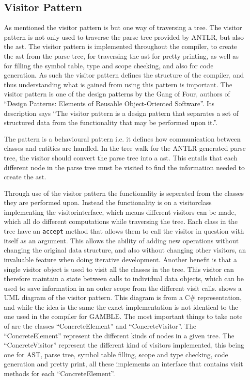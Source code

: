 \subsection*{Visitor Pattern}\label{subs:visit}
As mentioned the visitor pattern is but one way of traversing a tree.
The visitor pattern is not only used to traverse the parse tree provided by ANTLR, but also the \acrfull{ast}.
The visitor pattern is implemented throughout the compiler, to create the \acrfull{ast} from the parse tree, for traversing the \acrfull{ast} for pretty printing, as well as for filling the symbol table, type and scope checking, and also for code generation.
As such the visitor pattern defines the structure of the compiler, and thus understanding what is gained from using this pattern is important.
The visitor pattern is one of the design patterns by the Gang of Four, authors of ``Design Patterns: Elements of Reusable Object-Oriented Software''.
Its description says ``The visitor pattern is a design pattern that separates a set of structured data from the functionality that may be performed upon it.''. \citep{GOF}

The pattern is a behavioural pattern i.e. it defines how communication between classes and entities are handled.
In the tree walk for the ANTLR generated parse tree, the visitor should convert the parse tree into a \acrfull{ast}.
This entails that each different node in the parse tree must be visited to find the information needed to create the \acrfull{ast}.

Through use of the visitor pattern the functionality is seperated from the classes they are performed upon.
Instead the functionality is on a visitorclass implementing the visitorinterface, which means different visitors can be made, which all do different computations while traversing the tree.
Each class in the tree have an \texttt{accept} method that allows them to call the visitor in question with itself as an argument.
This allows the ability of adding new operations without changing the original data structure, and also without changing other visitors, an invaluable feature when doing iterative development.
Another benefit is that a single visitor object is used to visit all the classes in the tree.
This visitor can therefore maintain a state between calls to individual data objects, which can be used to save information in an outer scope from the different visit calls.
 shows a UML diagram of the visitor pattern.
This diagram is from a C\# representation, and while the idea is the same the exact implementation is not identical to the one used in the compiler for GAMBLE.
The most important things to take note of are the classes ``ConcreteElement'' and ``ConcreteVisitor''.
The ``ConcreteElement'' represent the different kinds of nodes in a given tree.
The ``ConcreteVisitor'' represent the different kind of visitors implemented, this being one for AST, parse tree, symbol table filling, scope and type checking, code generation and pretty print, all these implements an interface that contains visit methods for each ``ConcreteElement''.

